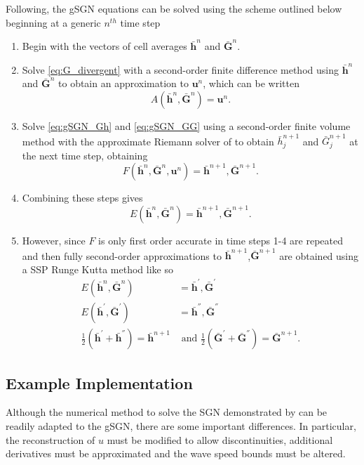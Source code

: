 \documentclass[10pt]{elsarticle}
\newcommand{\vecn}[1]{\boldsymbol{#1}}
\begin{document}
Following, \citet{Zoppou-etal-2017} the gSGN equations can be solved using the scheme outlined below beginning at a generic $n^{th}$ time step
\begin{enumerate}
	\item Begin with the vectors of cell averages $\bar{\vecn{h}}^n$ and $\bar{\vecn{G}}^n$.
	\item Solve \eqref{eq:G_divergent} with a second-order finite difference method using $\bar{\vecn{h}}^n$ and $\bar{\vecn{G}}^n$ to obtain an approximation to ${\vecn{u}}^n$, which can be written
	\[{A}\left(\bar{\vecn{h}}^n,\bar{\vecn{G}}^n\right) = {\vecn{u}}^n.\]
	\item Solve \eqref{eq:gSGN_Gh} and \eqref{eq:gSGN_GG} using a second-order finite volume method with the approximate Riemann solver of \citet{Kurganov-etal-2001-707} to obtain $\bar{h}^{n+1}_j$ and $\bar{G}^{n+1}_j$ at the next time step, obtaining
	\[{F}\left(\bar{\vecn{h}}^n,\bar{\vecn{G}}^n,{\vecn{u}}^n\right) = \bar{\vecn{h}}^{n+1 },\bar{\vecn{G}}^{n+1}.\]
	\item Combining these steps gives
	\[{E}(\bar{\vecn{h}}^{n},\bar{\vecn{G}}^{n}) = \bar{\vecn{h}}^{n+1 },\bar{\vecn{G}}^{n+1}.\]
	\item However, since ${F}$ is only first order accurate in time steps 1-4 are repeated and then fully second-order approximations to $\bar{\vecn{h}}^{n+1 }$,$\bar{\vecn{G}}^{n+1}$ are obtained using a SSP Runge Kutta method \cite{Gottlieb-etal-2003-89} like so
	\begin{align*}
	{E}(\bar{\vecn{h}}^{n},\bar{\vecn{G}}^{n}) &= \bar{\vecn{h}}^{'},\bar{\vecn{G}}^{'}\\
	{E}(\bar{\vecn{h}}^{'},\bar{\vecn{G}}^{'}) &= \bar{\vecn{h}}^{''},\bar{\vecn{G}}^{''}\\
	\frac{1}{2}\left(\bar{\vecn{h}}^{'} + \bar{\vecn{h}}^{''} \right) = \bar{\vecn{h}}^{n+1 } &\text{  and  }
		\frac{1}{2}\left(\bar{\vecn{G}}^{'} + \bar{\vecn{G}}^{''} \right) = \bar{\vecn{G}}^{n+1 }. 
	\end{align*}
\end{enumerate}

\subsection{Example Implementation}
Although the numerical method to solve the SGN demonstrated by \citet{Zoppou-etal-2017} can be readily adapted to the gSGN, there are some important differences. In particular, the reconstruction of $u$ must be modified to allow discontinuities, additional derivatives must be approximated and the wave speed bounds must be altered. 
\end{document}

